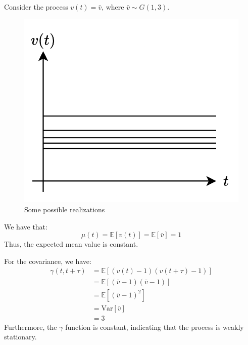 \begin{example}
    Consider the process $v(t)=\bar{v}$, where $\bar{v} \sim G(1,3)$. 
    \begin{figure}[H]
        \centering
        \includegraphics[width=0.25\linewidth]{images/static.png}
        \caption{Some possible realizations}
    \end{figure}
    We have that: 
    \[\mu(t)=\mathbb{E}\left[v(t)\right]=\mathbb{E}\left[\bar{v}\right]=1\]
    Thus, the expected mean value is constant.

    For the covariance, we have: 
    \begin{align*}
        \gamma(t,t+\tau)&=\mathbb{E}\left[\left(v(t)-1\right)\left(v(t+\tau)-1\right)\right] \\
                        &=\mathbb{E}\left[\left(\bar{v}-1\right)\left(\bar{v}-1\right)\right] \\
                        &=\mathbb{E}\left[\left(\bar{v}-1\right)^2\right] \\
                        &=\text{Var}\left[\bar{v}\right] \\
                        &=3
    \end{align*}
    Furthermore, the $\gamma$ function is constant, indicating that the process is weakly stationary.
\end{example}

